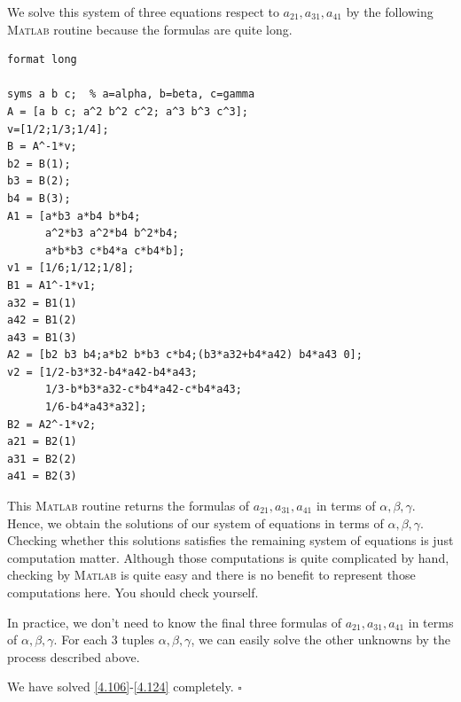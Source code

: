 \documentclass[a4paper,oneside]{book}
\numberwithin{equation}{chapter}
\begin{document}
We solve this system of three equations respect to $a_{21},a_{31},a_{41}$ by the following \textsc{Matlab} routine because the formulas are quite long.
\begin{verbatim}
format long

syms a b c;  % a=alpha, b=beta, c=gamma
A = [a b c; a^2 b^2 c^2; a^3 b^3 c^3];
v=[1/2;1/3;1/4];
B = A^-1*v;
b2 = B(1); 
b3 = B(2);
b4 = B(3);
A1 = [a*b3 a*b4 b*b4;
      a^2*b3 a^2*b4 b^2*b4;
      a*b*b3 c*b4*a c*b4*b];
v1 = [1/6;1/12;1/8];
B1 = A1^-1*v1;
a32 = B1(1)
a42 = B1(2)
a43 = B1(3)
A2 = [b2 b3 b4;a*b2 b*b3 c*b4;(b3*a32+b4*a42) b4*a43 0];
v2 = [1/2-b3*32-b4*a42-b4*a43;
      1/3-b*b3*a32-c*b4*a42-c*b4*a43;
      1/6-b4*a43*a32];
B2 = A2^-1*v2;
a21 = B2(1)
a31 = B2(2)
a41 = B2(3)
\end{verbatim} 

This \textsc{Matlab} routine returns the formulas of $a_{21},a_{31},a_{41}$ in terms of $\alpha,\beta,\gamma$. Hence, we obtain the solutions of our system of equations in terms of $\alpha,\beta,\gamma$. Checking whether this solutions satisfies the remaining system of equations is just computation matter. Although those computations is quite complicated by hand, checking by \textsc{Matlab} is quite easy and there is no benefit to represent those computations here. You should check yourself.

In practice, we don't need to know the final three formulas of $a_{21},a_{31},a_{41}$ in terms of $\alpha,\beta,\gamma$. For each 3 tuples $\alpha,\beta,\gamma$, we can easily solve the other unknowns by the process described above.

We have solved \eqref{4.106}-\eqref{4.124} completely. \hfill $\square$
\end{document}
